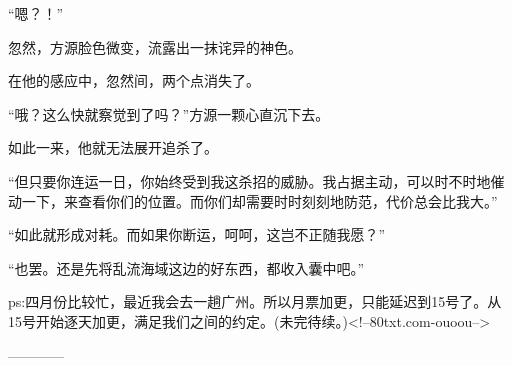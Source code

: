 \begin{this_body}
“嗯？！”

忽然，方源脸色微变，流露出一抹诧异的神色。

在他的感应中，忽然间，两个点消失了。

“哦？这么快就察觉到了吗？”方源一颗心直沉下去。

如此一来，他就无法展开追杀了。

“但只要你连运一日，你始终受到我这杀招的威胁。我占据主动，可以时不时地催动一下，来查看你们的位置。而你们却需要时时刻刻地防范，代价总会比我大。”

“如此就形成对耗。而如果你断运，呵呵，这岂不正随我愿？”

“也罢。还是先将乱流海域这边的好东西，都收入囊中吧。”

ps:四月份比较忙，最近我会去一趟广州。所以月票加更，只能延迟到15号了。从15号开始逐天加更，满足我们之间的约定。(未完待续。)<!--80txt.com-ouoou-->

------------

\end{this_body}

